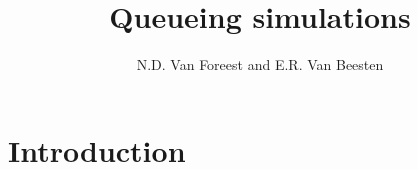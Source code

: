 \usepackage[solutionfiles]{optional}



\usepackage[english]{babel}

\usepackage{mathtools,amsthm,amssymb}
\usepackage{verbatim}
\usepackage[colorlinks=true]{hyperref}

\usepackage[T1]{fontenc}
\usepackage{fouriernc}
\usepackage{fontawesome} %
\newcommand{\hintsymbol}{\marginpar{\center{\faLinux}}}


\usepackage{pythontex}

\usepackage{fancyhdr}
\pagestyle{fancy}
\fancyhead{} %
\fancyhead[LO, LE]{\rightmark}
\fancyfoot{} %
\fancyfoot[C]{\thepage}
\setlength{\headheight}{14pt} 

\renewcommand{\Hintlabel}[1]{\textbf{h.#1}}
\renewcommand{\Solutionlabel}[1]{\textbf{s.#1}}

\theoremstyle{definition} %
\newtheorem{exercise}{Exercise}[section]

\usepackage{etoolbox}%
\AtBeginEnvironment{hint}{\hintsymbol} 

\newcommand{\E}[1]{\,\mathsf{E}\left[#1\right]}

\title{Queueing simulations}
\author{N.D. Van Foreest and E.R. Van Beesten}


\maketitle

\tableofcontents

\clearpage



\section*{Introduction}

